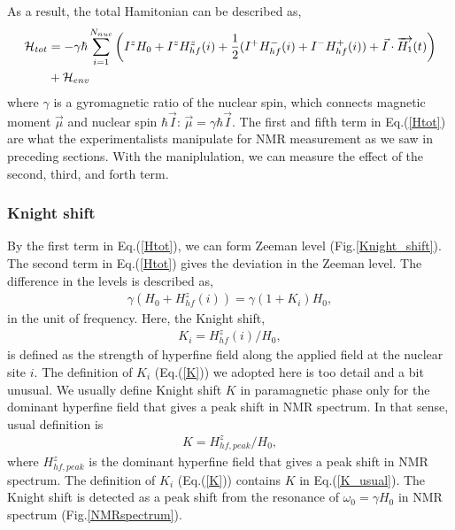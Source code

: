 \documentclass[a4,10.5pt]{report}
\begin{document}
As a result, the total Hamitonian can be described as,
\begin{align}
\mathcal{H}_{tot} &= -\gamma\hbar\sum^{N_{nuc}}_{i = 1} \left(I^zH_0 + I^zH^z_{hf}(i) 
 + \frac{1}{2}(I^+H^-_{hf}(i)+I^-H^+_{hf}(i))+\vec{I}\cdot\overrightarrow{H_1}(t)\right) \label{Htot}\\
 & + \mathcal{H}_{env} \notag
\end{align}
where $\gamma$ is a gyromagnetic ratio of the nuclear spin, which connects magnetic moment $\vec{\mu}$ and nuclear spin $\hbar\vec{I}$: $\vec{\mu} = \gamma\hbar\vec{I}$.
The first and fifth term in Eq.(\ref{Htot}) are what the experimentalists manipulate for NMR measurement as we saw in preceding sections.
With the maniplulation, we can measure the effect of the second, third, and forth term. 

\subsubsection{Knight shift}
By the first term in Eq.(\ref{Htot}), we can form Zeeman level (Fig.\ref{Knight_shift}).
The second term in Eq.(\ref{Htot}) gives the deviation in the Zeeman level.
The difference in the levels is described as,
\begin{align}
\gamma (H_0 + H^z_{hf}(i)) = \gamma (1 + K_i)H_0,
\end{align}
in the unit of frequency.
Here, the Knight shift, 
\begin{align}
\label{K}
K_i = H^z_{hf}(i)/H_0,
\end{align}
is defined as the strength of hyperfine field along the applied field at the nuclear site $i$.
The definition of $K_i$ (Eq.(\ref{K})) we adopted here is too detail and a bit unusual.
We usually define Knight shift $K$ in paramagnetic phase only for the dominant hyperfine field that gives a peak shift in NMR spectrum.
In that sense, usual definition is 
\begin{align}
\label{K_usual}
K = H^z_{hf, peak}/H_0,
\end{align}
where $H^z_{hf, peak}$ is the dominant hyperfine field that gives a peak shift in NMR spectrum.
The definition of $K_i$ (Eq.(\ref{K})) contains $K$ in Eq.(\ref{K_usual}).
The Knight shift is detected as a peak shift from the resonance of $\omega_0 = \gamma H_0$ in NMR spectrum (Fig.\ref{NMRspectrum}).
\end{document}

